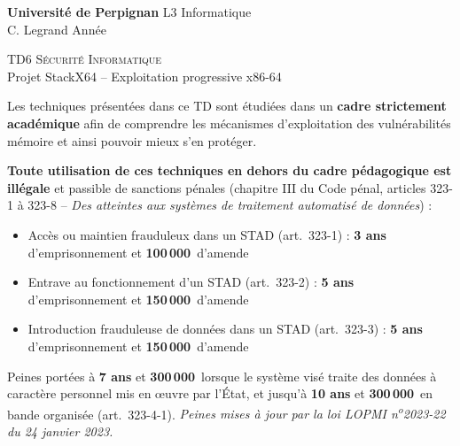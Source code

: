 \documentclass[a4paper,11pt]{article}
\theoremstyle{plain}
\theoremstyle{definition}
\begin{document}
\hbox{}
\noindent \textbf{Université de Perpignan} \hfill  L3 Informatique \\
 \hfill C. Legrand \hfill  Année \the\year  \\
\smallskip
\begin{center}
{
 {\scshape \large TD6 Sécurité Informatique}  \\
 Projet StackX64 -- Exploitation progressive x86-64
}
\end{center}
\hbox{}

\bigskip

\begin{ethique}
Les techniques présentées dans ce TD sont étudiées dans un \textbf{cadre strictement académique} afin de comprendre les mécanismes d'exploitation des vulnérabilités mémoire et ainsi pouvoir mieux s'en protéger.

\textbf{Toute utilisation de ces techniques en dehors du cadre pédagogique est illégale} et passible de sanctions pénales (chapitre III du Code pénal, articles 323-1 à 323-8 -- \textit{Des atteintes aux systèmes de traitement automatisé de données}) :
\begin{itemize}
    \item Accès ou maintien frauduleux dans un STAD (art.~323-1) : \textbf{3 ans} d'emprisonnement et \textbf{100\,000\,\texteuro{}} d'amende
    \item Entrave au fonctionnement d'un STAD (art.~323-2) : \textbf{5 ans} d'emprisonnement et \textbf{150\,000\,\texteuro{}} d'amende
    \item Introduction frauduleuse de données dans un STAD (art.~323-3) : \textbf{5 ans} d'emprisonnement et \textbf{150\,000\,\texteuro{}} d'amende
\end{itemize}
Peines portées à \textbf{7 ans} et \textbf{300\,000\,\texteuro{}} lorsque le système visé traite des données à caractère personnel mis en \oe uvre par l'État, et jusqu'à \textbf{10 ans} et \textbf{300\,000\,\texteuro{}} en bande organisée (art.~323-4-1). \textit{Peines mises à jour par la loi LOPMI n\textsuperscript{o}2023-22 du 24 janvier 2023.}
\end{ethique}

\bigskip

\end{document}
